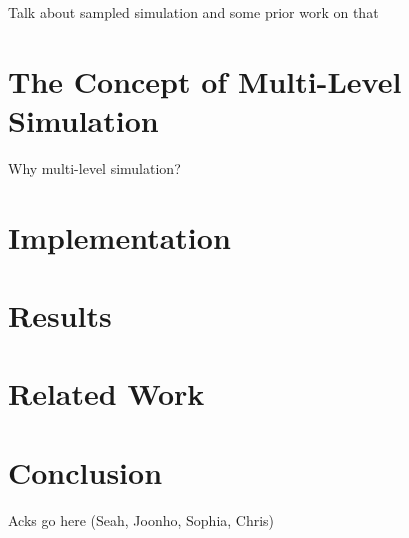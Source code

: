 \documentclass[sigplan,nonacm,10pt]{acmart}
\begin{document}
Talk about sampled simulation and some prior work on that

\section{The Concept of Multi-Level Simulation}

Why multi-level simulation?

\section{Implementation}

\section{Results}

\section{Related Work}

\section{Conclusion}

\begin{acks}
Acks go here (Seah, Joonho, Sophia, Chris)
\end{acks}




\end{document}
